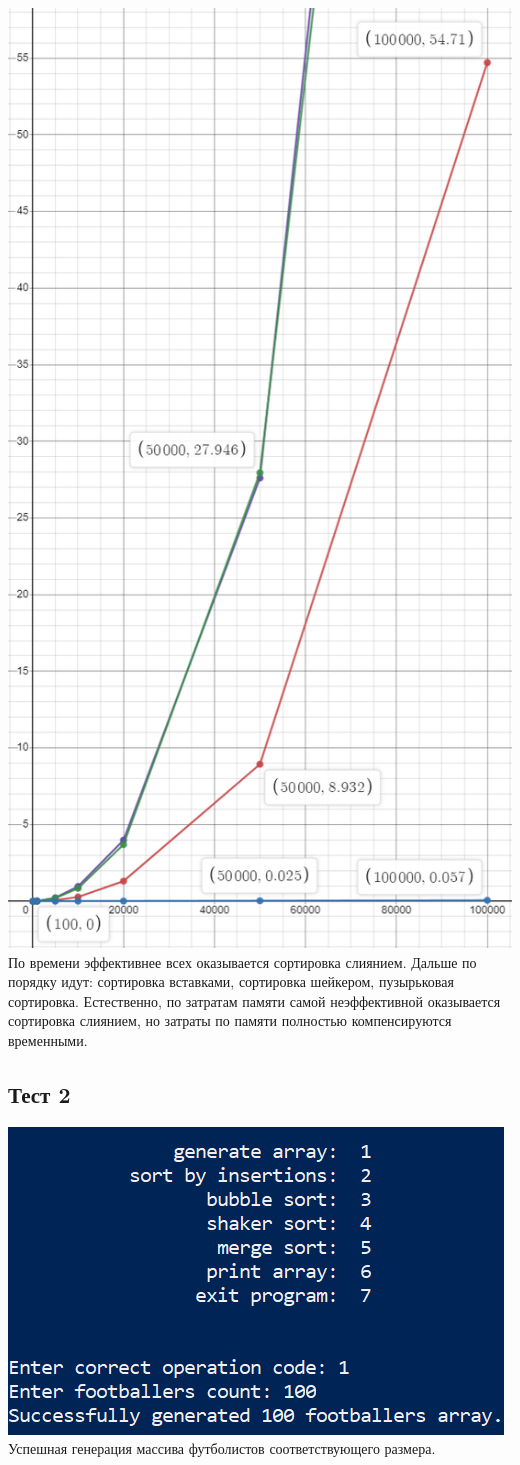\documentclass[12pt]{article}
\begin{document}
	\includegraphics[width=0.75\linewidth]{graphics.png} \newline
	По времени эффективнее всех оказывается сортировка слиянием. Дальше по порядку идут: сортировка вставками, сортировка шейкером, пузырьковая сортировка.
	Естественно, по затратам памяти самой неэффективной оказывается сортировка слиянием, но затраты по памяти полностью компенсируются временными.
	
	\subsection{Тест 2}
	\includegraphics[width=1\linewidth]{test_2.png} \newline
	Успешная генерация массива футболистов соответствующего размера.
	
\end{document}
